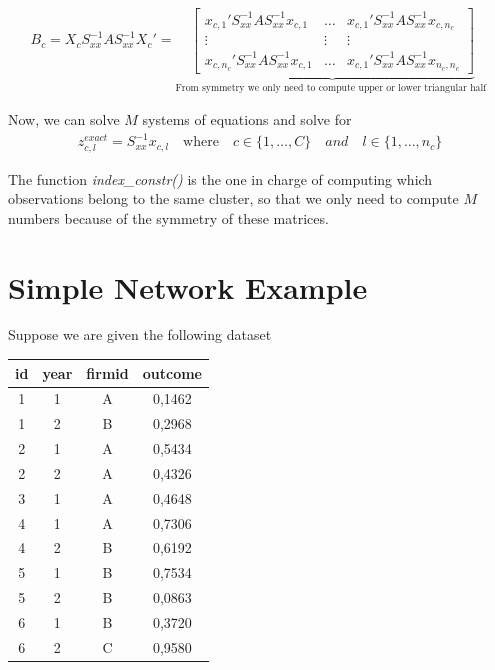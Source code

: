 \documentclass[12pt]{article}
\begin{document}
\begin{align*}
    B_c = X_c S_{xx}^{-1} A S_{xx}^{-1} X_c' = \underbrace{ \begin{bmatrix} x_{c,1}' S_{xx}^{-1} A S_{xx}^{-1} x_{c,1} & \dots & x_{c,1}' S_{xx}^{-1} A S_{xx}^{-1} x_{c,n_c}  \\ \vdots & \vdots & \vdots \\ x_{c,n_c}' S_{xx}^{-1} A S_{xx}^{-1}  x_{c,1} & \dots & x_{c,1}' S_{xx}^{-1} A S_{xx}^{-1}  x_{n_c,n_c} \end{bmatrix} }_\text{From symmetry we only need to compute upper or lower triangular half }
\end{align*}

Now, we can solve $M$ systems of equations and solve for
 \begin{align*}
     z_{c,l}^{exact} = S_{xx}^{-1} x_{c,l} \quad \text{where} \quad c\in\{1,\dots,C\} \quad and \quad l\in\{1,\dots,n_c\}
 \end{align*}

The function \textit{index\_constr()} is the one in charge of computing which observations belong to the same cluster, so that we only need to compute $M$ numbers because of the symmetry of these matrices.


\clearpage
\appendix

\section{Simple Network Example}

Suppose we are given the following dataset

\begin{table}[h!]
    \centering
\begin{tabular}{|c c c c|} 
 \hline
 id & year & firmid & outcome \\ [0.5ex] 
 \hline\hline
 1 & 1 & A &  0,1462\\ 
 \hline
 1 & 2 & B & 0,2968 \\
 \hline
 2 & 1 & A &  0,5434\\
 \hline
 2 & 2 & A & 0,4326 \\
 \hline
 3 & 1 & A & 0,4648 \\
 \hline
 4 & 1 & A & 0,7306 \\
 \hline
 4 & 2 & B & 0,6192 \\
 \hline
 5 & 1 & B &  0,7534\\
 \hline
 5 & 2 & B &  0,0863\\
 \hline
6 & 1 & B &  0,3720\\
 \hline
 6 & 2 & C & 0,9580 \\ [1ex] 
 \hline
\end{tabular}
\end{table}
\end{document}
